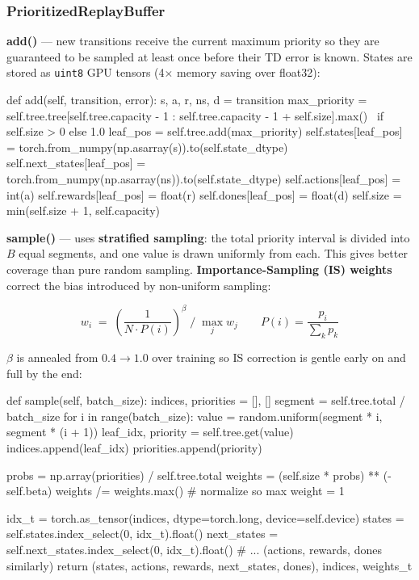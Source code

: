 \documentclass[12pt,a4paper]{report}
\begin{document}
\subsubsection*{PrioritizedReplayBuffer}

\textbf{add()} — new transitions receive the current maximum priority so they are
guaranteed to be sampled at least once before their TD error is known.
States are stored as \texttt{uint8} GPU tensors (4$\times$ memory saving over float32):

\begin{pycode}
def add(self, transition, error):
    s, a, r, ns, d = transition
    max_priority = self.tree.tree[self.tree.capacity - 1 :
                                  self.tree.capacity - 1 + self.size].max() \
                   if self.size > 0 else 1.0
    leaf_pos = self.tree.add(max_priority)
    self.states[leaf_pos]      = torch.from_numpy(np.asarray(s)).to(self.state_dtype)
    self.next_states[leaf_pos] = torch.from_numpy(np.asarray(ns)).to(self.state_dtype)
    self.actions[leaf_pos]     = int(a)
    self.rewards[leaf_pos]     = float(r)
    self.dones[leaf_pos]       = float(d)
    self.size = min(self.size + 1, self.capacity)
\end{pycode}

\textbf{sample()} — uses \textbf{stratified sampling}: the total priority interval is
divided into $B$ equal segments, and one value is drawn uniformly from each.
This gives better coverage than pure random sampling.
\textbf{Importance-Sampling (IS) weights} correct the bias introduced by non-uniform
sampling:

\[
  w_i \;=\; \left(\frac{1}{N \cdot P(i)}\right)^{\!\beta}
  \;\Big/\;
  \max_j w_j
  \qquad
  P(i) = \frac{p_i}{\sum_k p_k}
\]

$\beta$ is annealed from $0.4 \to 1.0$ over training so IS correction is gentle early on
and full by the end:

\begin{pycode}
def sample(self, batch_size):
    indices, priorities = [], []
    segment = self.tree.total / batch_size
    for i in range(batch_size):
        value = random.uniform(segment * i, segment * (i + 1))
        leaf_idx, priority = self.tree.get(value)
        indices.append(leaf_idx)
        priorities.append(priority)

    probs   = np.array(priorities) / self.tree.total
    weights = (self.size * probs) ** (-self.beta)
    weights /= weights.max()                          # normalize so max weight = 1

    idx_t       = torch.as_tensor(indices, dtype=torch.long, device=self.device)
    states      = self.states.index_select(0, idx_t).float()
    next_states = self.next_states.index_select(0, idx_t).float()
    # ... (actions, rewards, dones similarly)
    return (states, actions, rewards, next_states, dones), indices, weights_t
\end{pycode}
\end{document}
